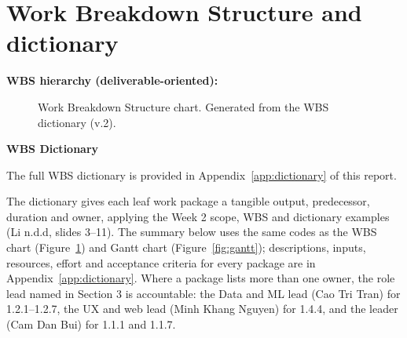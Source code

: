 \section{Work Breakdown Structure and dictionary}
\label{sec:wbs}

\textbf{WBS hierarchy (deliverable-oriented):}

\begin{figure}[H]
  \centering
  \caption[Work Breakdown Structure chart]{Work Breakdown Structure chart. Generated from the WBS dictionary (v.2).}
  \label{fig:wbs}
\end{figure}

\textbf{WBS Dictionary}

The full WBS dictionary is provided in Appendix~\ref{app:dictionary} of this report.

The dictionary gives each leaf work package a tangible output, predecessor, duration and owner, applying the Week 2 scope, WBS and dictionary examples (Li n.d.d, slides 3–11). The summary below uses the same codes as the WBS chart (Figure~\ref{fig:wbs}) and Gantt chart (Figure~\ref{fig:gantt}); descriptions, inputs, resources, effort and acceptance criteria for every package are in Appendix~\ref{app:dictionary}. Where a package lists more than one owner, the role lead named in Section 3 is accountable: the Data and ML lead (Cao Tri Tran) for 1.2.1–1.2.7, the UX and web lead (Minh Khang Nguyen) for 1.4.4, and the leader (Cam Dan Bui) for 1.1.1 and 1.1.7.

